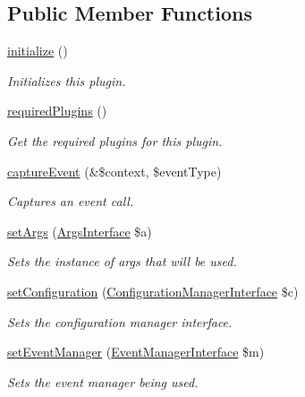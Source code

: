 \subsection*{Public Member Functions}
\begin{DoxyCompactItemize}
\item 
\hyperlink{classHostsConfigurationPlugin_a74b0cbf46ff7fe5ed232070b38a8b71b}{initialize} ()
\begin{DoxyCompactList}\small\item\em Initializes this plugin. \end{DoxyCompactList}\item 
\hyperlink{classHostsConfigurationPlugin_aba0c4ae00f36de5d2552a76e463ecc86}{required\-Plugins} ()
\begin{DoxyCompactList}\small\item\em Get the required plugins for this plugin. \end{DoxyCompactList}\item 
\hyperlink{classHostsConfigurationPlugin_a6044f4b0f96c527fa72cc0da0b251a96}{capture\-Event} (\&\$context, \$event\-Type)
\begin{DoxyCompactList}\small\item\em Captures an event call. \end{DoxyCompactList}\item 
\hyperlink{classGenericPlugin_abf0b12b47909ef3c4dada146ea775526}{set\-Args} (\hyperlink{interfaceArgsInterface}{Args\-Interface} \$a)
\begin{DoxyCompactList}\small\item\em Sets the instance of args that will be used. \end{DoxyCompactList}\item 
\hyperlink{classGenericPlugin_a009c5398920a9672a2f13af38756fd5f}{set\-Configuration} (\hyperlink{interfaceConfigurationManagerInterface}{Configuration\-Manager\-Interface} \$c)
\begin{DoxyCompactList}\small\item\em Sets the configuration manager interface. \end{DoxyCompactList}\item 
\hyperlink{classGenericPlugin_afc683b68f471d89aa6a95daebcbfe28a}{set\-Event\-Manager} (\hyperlink{interfaceEventManagerInterface}{Event\-Manager\-Interface} \$m)
\begin{DoxyCompactList}\small\item\em Sets the event manager being used. \end{DoxyCompactList}\item 

\end{DoxyCompactItemize}
